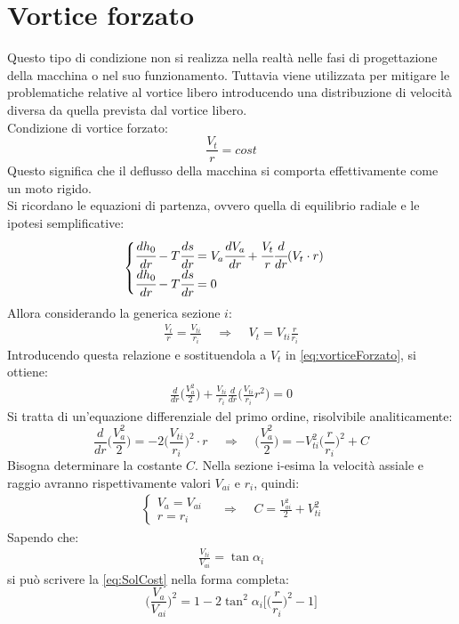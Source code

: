 \section{Vortice forzato}
Questo tipo di condizione non si realizza nella realtà nelle fasi di progettazione della macchina o nel suo funzionamento. Tuttavia viene utilizzata per mitigare le problematiche relative al vortice libero introducendo una distribuzione di velocità diversa da quella prevista dal vortice libero.\\
Condizione di vortice forzato:
\begin{equation}
\boxed{\frac{V_t}{r} = cost}
\label{eq:VortForz}
\end{equation}
Questo significa che il deflusso della macchina si comporta effettivamente come un moto rigido.\\
Si ricordano le equazioni di partenza, ovvero quella di equilibrio radiale e le ipotesi semplificative:
\begin{equation}
\begin{cases}
\cfrac{dh_0}{dr} - T\cfrac{ds}{dr} = V_a \cfrac{dV_a}{dr} + \cfrac{V_t}{r} \cfrac{d}{dr}(V_t \cdot r)\\
\cfrac{dh_0}{dr} - T\cfrac{ds}{dr} = 0
\end{cases}
\label{eq:vorticeForzato}
\end{equation}
Allora considerando la generica sezione $i$:
\begin{align*}
\frac{V_t}{r} = \frac{V_{ti}}{r_i} \;\;\;\; \Rightarrow \;\;\;\; V_t = V_{ti} \frac{r}{r_i}
\end{align*}
Introducendo questa relazione e sostituendola a $V_{t}$ in \ref{eq:vorticeForzato}, si ottiene:
\begin{align*}
\frac{d}{dr}\bigg( \frac{V_a^2}{2} \bigg) + \frac{V_{ti}}{r_i} \frac{d}{dr} \bigg(\frac{V_{ti}}{r_i} r^2 \bigg) = 0
\end{align*}
Si tratta di un'equazione differenziale del primo ordine, risolvibile analiticamente:
\begin{equation}
\frac{d}{dr} \bigg( \frac{V_a^2}{2} \bigg) = -2 \bigg( \frac{V_{ti}}{r_i} \bigg) ^2 \cdot r
\;\;\;\; \Rightarrow \;\;\;\; 
\bigg( \frac{V_a^2}{2} \bigg) = - V_{ti}^2 \bigg(\frac{r}{r_i} \bigg)^2 +C
\label{eq:SolCost}
\end{equation}
Bisogna determinare la costante $C$. Nella sezione i-esima la velocità assiale e raggio avranno rispettivamente valori $V_{ai}$ e $r_i$, quindi:
\begin{align*}
\begin{cases}
V_a=V_{ai}\\
r=r_i
\end{cases}
\;\;\;\; \Rightarrow \;\;\;\;
C = \frac{V_{ai}^2}{2} +  V_{ti}^2
\end{align*}
Sapendo che:
\begin{align*}
\frac{V_{ti}}{V_{ai}} = \tan \alpha_i
\end{align*}
si può scrivere la \ref{eq:SolCost} nella forma completa:
\begin{equation}
\boxed{ \bigg( \frac{V_a}{V_{ai}} \bigg)^2 = 1- 2 \tan^2 \alpha_i \bigg[ \bigg( \frac{r}{r_i} \bigg)^2 -1 \bigg] }
\label{eq:RappVol}
\end{equation}

